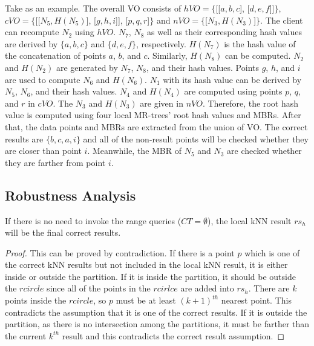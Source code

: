 Take  as an example. The overall VO consists of $hVO=\{$[[$a, b, c$], [$d, e, f$]]$\}$, $cVO=\{$[[$N_{5}, H(N_{5})$], [$g, h, i$]], [$p, q, r$]$\}$ and $nVO=\{$[$N_{3}, H(N_{3})$]$\}$. The client can recompute $N_{2}$ using $hVO$. $N_{7}$, $N_{8}$ as well as their corresponding hash values are derived by $\{a, b, c\}$ and $\{d, e, f\}$, respectively. $H(N_{7})$ is the hash value of the concatenation of points $a$, $b$, and $c$. Similarly, $H(N_{8})$ can be computed. $N_{2}$ and $H(N_{2})$ are generated by $N_{7}$, $N_{8}$, and their hash values. Points $g$, $h$, and $i$ are used to compute $N_{6}$ and $H(N_{6})$. $N_{1}$ with its hash value can be derived by $N_{5}$, $N_{6}$, and their hash values. $N_{4}$ and $H(N_{4})$ are computed using points $p$, $q$, and $r$ in $cVO$. The $N_{3}$ and $H(N_{3})$ are given in $nVO$. Therefore, the root hash value is computed using four local MR-trees' root hash values and MBRs. After that, the data points and MBRs are extracted from the union of VO\@. The correct results are $\{b, c, a, i\}$ and all of the non-result points will be checked whether they are closer than point $i$. Meanwhile, the MBR of $N_{5}$ and $N_{3}$ are checked whether they are farther from point $i$.

\subsection{Robustness Analysis}

\begin{lemma}\label{lem:knn:l1}
  If there is no need to invoke the range queries ($CT=\emptyset$), the local kNN result $rs_{h}$ will be the final correct results.
\end{lemma}

\begin{proof}
  This can be proved by contradiction. If there is a point $p$ which is one of the correct kNN results but not included in the local kNN result, it is either inside or outside the partition. If it is inside the partition, it should be outside the $rcircle$ since all of the points in the $rcirlce$ are added into $rs_{h}$. There are $k$ points inside the $rcircle$, so $p$ must be at least ${(k+1)}^{th}$ nearest point. This contradicts the assumption that it is one of the correct results. If it is outside the partition, as there is no intersection among the partitions, it must be farther than the current $k^{th}$ result and this contradicts the correct result assumption.
\end{proof}

